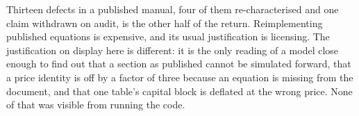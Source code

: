 Thirteen defects in a published manual, four of them re-characterised and one claim withdrawn on audit, is the other half of the return. Reimplementing published equations is expensive, and its usual justification is licensing. The justification on display here is different: it is the only reading of a model close enough to find out that a section as published cannot be simulated forward, that a price identity is off by a factor of three because an equation is missing from the document, and that one table's capital block is deflated at the wrong price. None of that was visible from running the code.
